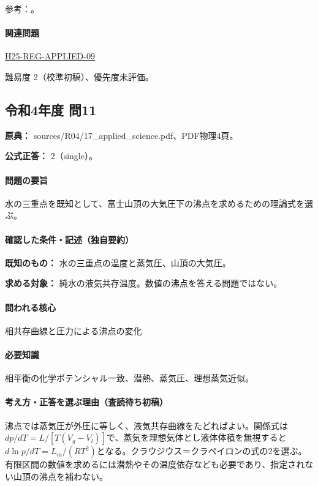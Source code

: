 \par 参考：\cite{mit_thermo_adiabatic2008,mit_clapeyron2008,mit_solutions2008}。

\paragraph{関連問題} \hyperref[q:h25-reg-applied-09]{H25-REG-APPLIED-09}

\par 難易度 2（校準初稿）、優先度未評価。

\subsection{令和4年度 問11}
\label{q:r04-reg-applied-11}

\noindent\textbf{原典：} sources/R04/17\_applied\_science.pdf、PDF物理4頁。

\textbf{公式正答：} 2（single）。

\paragraph{問題の要旨} 水の三重点を既知として、富士山頂の大気圧下の沸点を求めるための理論式を選ぶ。

\paragraph{確認した条件・記述（独自要約）}\mbox{}\par

\noindent\textbf{既知のもの：} 水の三重点の温度と蒸気圧、山頂の大気圧。\par

\noindent\textbf{求める対象：} 純水の液気共存温度。数値の沸点を答える問題ではない。\par

\paragraph{問われる核心} 相共存曲線と圧力による沸点の変化

\paragraph{必要知識} 相平衡の化学ポテンシャル一致、潜熱、蒸気圧、理想蒸気近似。

\paragraph{考え方・正答を選ぶ理由（査読待ち初稿）} 沸点では蒸気圧が外圧に等しく、液気共存曲線をたどればよい。関係式は\(dp/dT=L/[T(V_g-V_l)]\)で、蒸気を理想気体とし液体体積を無視すると\(d\ln p/dT=L_m/(RT^2)\)となる。クラウジウス＝クラペイロンの式の2を選ぶ。有限区間の数値を求めるには潜熱やその温度依存なども必要であり、指定されない山頂の沸点を補わない。

